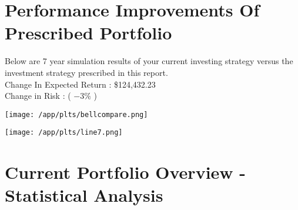\documentclass{article}
\begin{document}



\newpage    %

\section{Performance Improvements Of Prescribed Portfolio}

Below are 7 year simulation results of your current investing strategy versus the investment strategy prescribed in this report. \\
Change In Expected Return : \$124,432.23\\
Change in Risk : ( $- 3\%$ )

\vspace{.4cm}
\begin{center}


\hspace*{-1cm}\texttt{[image: /app/plts/bellcompare.png]}\par

\vspace{.5cm}

\hspace*{-1cm}\texttt{[image: /app/plts/line7.png]}\par
\end{center}

\newpage    %

\section{Current Portfolio Overview - Statistical Analysis}

\vspace{1.5cm}

\end{document}
